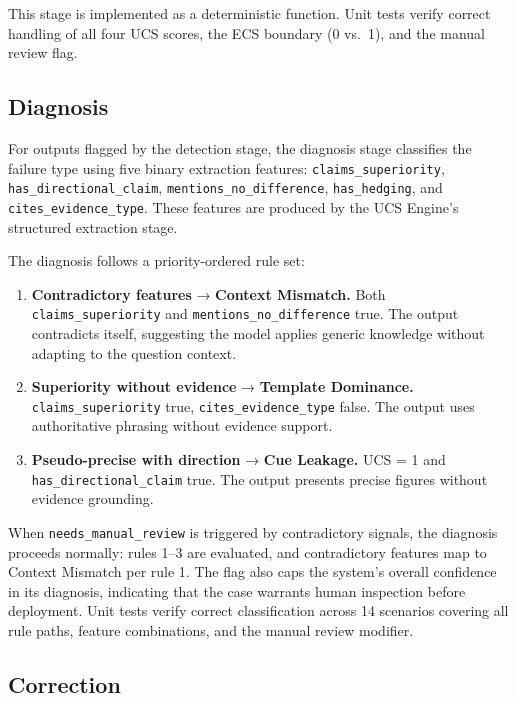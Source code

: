 \documentclass[manuscript, review, anonymous]{acmart}
\begin{document}
This stage is implemented as a deterministic function. Unit tests verify correct handling of all four UCS scores, the ECS boundary (0 vs.\ 1), and the manual review flag.

\subsection{Diagnosis}
\label{sec:diagnosis}

For outputs flagged by the detection stage, the diagnosis stage classifies the failure type using five binary extraction features: \texttt{claims\_superiority}, \texttt{has\_directional\_claim}, \texttt{mentions\_no\_difference}, \texttt{has\_hedging}, and \texttt{cites\_evidence\_type}. These features are produced by the UCS Engine's structured extraction stage.

The diagnosis follows a priority-ordered rule set:

\begin{enumerate}
    \item \textbf{Contradictory features} → \textbf{Context Mismatch.} Both \texttt{claims\_superiority} and \texttt{mentions\_no\_difference} true. The output contradicts itself, suggesting the model applies generic knowledge without adapting to the question context.
    \item \textbf{Superiority without evidence} → \textbf{Template Dominance.} \texttt{claims\_superiority} true, \texttt{cites\_evidence\_type} false. The output uses authoritative phrasing without evidence support.
    \item \textbf{Pseudo-precise with direction} → \textbf{Cue Leakage.} UCS = 1 and \texttt{has\_directional\_claim} true. The output presents precise figures without evidence grounding.
\end{enumerate}

When \texttt{needs\_manual\_review} is triggered by contradictory signals, the diagnosis proceeds normally: rules 1--3 are evaluated, and contradictory features map to Context Mismatch per rule 1. The flag also caps the system's overall confidence in its diagnosis, indicating that the case warrants human inspection before deployment. Unit tests verify correct classification across 14 scenarios covering all rule paths, feature combinations, and the manual review modifier.

\subsection{Correction}
\end{document}
